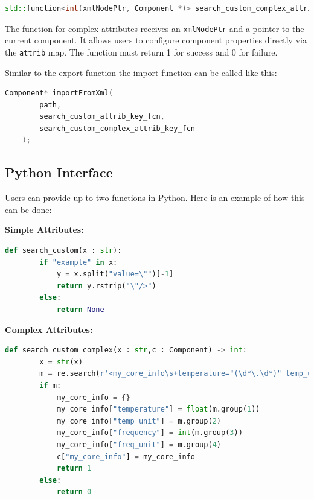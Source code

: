     \begin{lstlisting}[language=C++, xleftmargin=4em, frame = single]
    std::function<int(xmlNodePtr, Component *)> search_custom_complex_attrib_key_fcn = NULL;
    \end{lstlisting}
    The function for complex attributes receives an \verb|xmlNodePtr| and a pointer to the current component. It allows users to configure component properties directly via the \verb|attrib| map. The function must return 1 for success and 0 for failure.

    Similar to the export function the import function can be called like this:

    \begin{lstlisting}[language=C++, xleftmargin=4em, frame = single]
    Component* importFromXml(
        path, 
        search_custom_attrib_key_fcn, 
        search_custom_complex_attrib_key_fcn
    );
    \end{lstlisting}

\subsection{Python Interface}

Users can provide up to two functions in Python. Here is an example of how this can be done:

\textbf{Simple Attributes:}
    \begin{lstlisting}[language=Python, xleftmargin=4em, frame = single]
    def search_custom(x : str):
        if "example" in x:
            y = x.split("value=\"")[-1]
            return y.rstrip("\"/>")
        else:
            return None
    \end{lstlisting}

\textbf{Complex Attributes:}
    \begin{lstlisting}[language=Python, xleftmargin=4em, frame = single]
    def search_custom_complex(x : str,c : Component) -> int:
        x = str(x)
        m = re.search(r'<my_core_info\s+temperature="(\d*\.\d*)" temp_unit="(\w*)" frequency="(\d*)" freq_unit="(\w*)"/>', x)
        if m:
            my_core_info = {}
            my_core_info["temperature"] = float(m.group(1))
            my_core_info["temp_unit"] = m.group(2)
            my_core_info["frequency"] = int(m.group(3))
            my_core_info["freq_unit"] = m.group(4)
            c["my_core_info"] = my_core_info
            return 1
        else:
            return 0
    \end{lstlisting}

